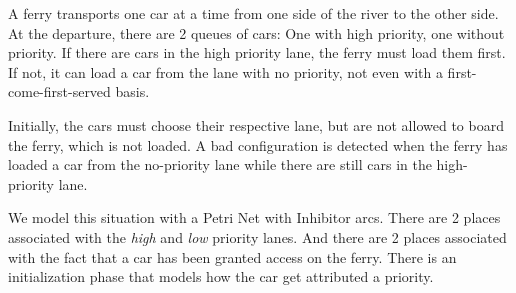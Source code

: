A ferry transports one car at a time from one side of the river to the
other side.
%
At the departure, there are 2 queues of cars: One with high priority,
one without priority.
%
If there are cars in the high priority lane, the ferry must load them
first. If not, it can load a car from the lane with no priority, not
even with a first-come-first-served basis.

Initially, the cars must choose their respective lane, but are not
allowed to board the ferry, which is not loaded.
%
A bad configuration is detected when the ferry has loaded a car from
the no-priority lane while there are still cars in the high-priority
lane.


We model this situation with a Petri Net with Inhibitor arcs. %
There are 2 places associated with the \emph{high} and \emph{low}
priority lanes. %
And there are 2 places associated with the fact that a car has been
granted access on the ferry. %
There is an initialization phase that models how the car get
attributed a priority. %

